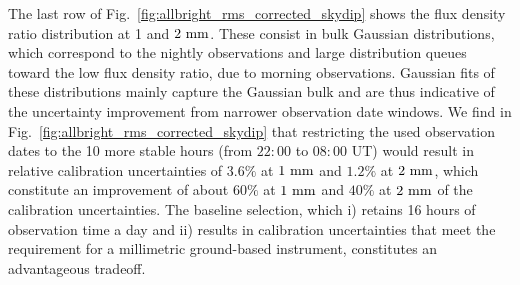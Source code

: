 The last row of
Fig.~\ref{fig:allbright_rms_corrected_skydip} shows the flux density
ratio distribution at 1 and $2~\rm{mm}$. These consist in bulk Gaussian
distributions, which correspond to the nightly observations and large
distribution queues toward the low flux density ratio, due to morning
observations. Gaussian fits of these distributions mainly capture the
Gaussian bulk and are thus indicative of the uncertainty improvement
from narrower observation date windows. We find in
Fig.~\ref{fig:allbright_rms_corrected_skydip} that restricting the
used observation dates to the 10 more stable hours (from $22:00$ to
$08:00$ UT) would result in relative calibration uncertainties of
$3.6\%$ at $1~\rm{mm}$ and $1.2\%$ at $2~\rm{mm}$, which constitute an
improvement of about $60\%$ at $1~\rm{mm}$ and $40\%$ at
$2~\rm{mm}$ of the calibration uncertainties.  
The baseline selection, which i) retains 16 hours of observation time
a day and ii) results in calibration uncertainties that meet the
requirement for a millimetric ground-based instrument, constitutes an
advantageous tradeoff.  



